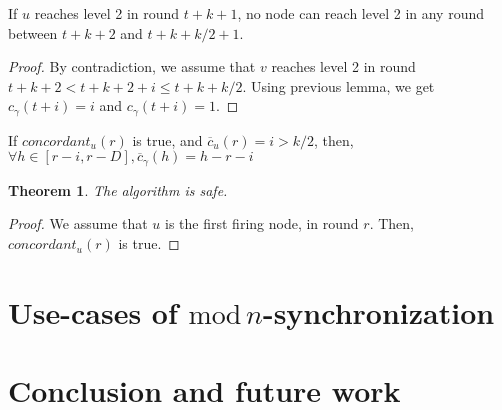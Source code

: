 \documentclass[11pt,letterpaper]{article}
\renewcommand{\leq}{\leqslant}
\newtheorem{thm}{Theorem}
\newcommand{\cent}{\gamma}
\begin{document}
\begin{lemma}
	If $u$ reaches level 2 in round $t+k+1$, no node can reach level 2 in any round between $t+k+2$ and $t+k+k/2+1$.
\end{lemma}
\begin{proof}
	By contradiction, we assume that $v$ reaches level 2 in round $t+k+2 < t+k+2+i \leq t+k+k/2$.
	Using previous lemma, we get $c_\cent(t+i) = i$ and $c_\cent(t+i) = 1$.
\end{proof}


\begin{lemma}
	If $concordant_u(r)$ is true, and $\overline{c}_u(r) = i > k/2$, then, $\forall h \in [r-i, r-D], \overline{c}_\cent(h) = h-r-i$
\end{lemma}

\begin{thm}
	The algorithm is safe.
\end{thm}
\begin{proof}
	We assume that $u$ is the first firing node, in round $r$.
	Then, $concordant_u(r)$ is true.
\end{proof}

\section{Use-cases of $\mathrm{mod}\,n$-synchronization}

\section{Conclusion and future work}


\printbibliography
\end{document}
